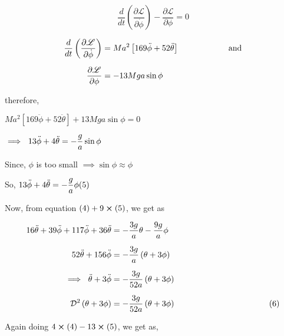 \documentclass[12pt, a4paper]{article} %
\begin{document}
\[\frac{d}{dt}\left(\frac{\partial \mathscr{L}}{\partial \dot{\phi}}\right) - \frac{\partial \mathscr{L}}{\partial \phi} = 0\]

\begin{equation*}
    \begin{split}
        \frac{d}{dt}\left(\frac{\partial \mathscr{L}}{\partial \dot{\phi}}\right) & = Ma^2\left[169\ddot{\phi} + 52\ddot{\theta}\right] \hspace*{2cm}\ \mbox{and}\\[2mm]
        \frac{\partial \mathscr{L}}{\partial \phi} & = -13Mga\sin\phi
    \end{split}
\end{equation*}

therefore,

\begin{center}
    $\displaystyle Ma^2\left[169\ddot{\phi} + 52\ddot{\theta}\right] + 13Mga\sin\phi = 0$
\end{center}

\begin{center}
    $\implies\ \displaystyle 13\ddot{\phi} + 4\ddot{\theta} = -\frac{g}{a}\sin\phi \hspace*{4cm}$

    Since, $\phi$ is too small $\implies \sin\phi\approx \phi$

    So, $\displaystyle 13\ddot{\phi} + 4\ddot{\theta} = -\frac{g}{a}\phi \hfil (5)$
\end{center}

Now, from equation $(4) + 9\cross(5)$, we get as

\begin{equation*}
    \begin{split}
        16\ddot{\theta} + 39\ddot{\phi} + 117\ddot{\phi} + 36\ddot{\theta} & = -\frac{3g}{a}\theta -\frac{9g}{a}\phi\\[2mm]
        52\ddot{\theta} + 156\ddot{\phi} & = -\frac{3g}{a}\left(\theta + 3\phi\right) \\[2mm]
        \implies\ \ddot{\theta} + 3\ddot{\phi} & = -\frac{3g}{52a}\left(\theta + 3\phi\right)\\[2mm]
        \mathcal{D}^2\left(\theta + 3\phi\right) & = -\frac{3g}{52a}\left(\theta + 3\phi\right) \hspace*{4cm} (6)
    \end{split}
\end{equation*}

Again doing $4\cross(4) - 13\cross(5)$, we get as,
\end{document}
